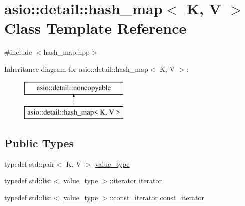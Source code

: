 \hypertarget{classasio_1_1detail_1_1hash__map}{}\section{asio\+:\+:detail\+:\+:hash\+\_\+map$<$ K, V $>$ Class Template Reference}
\label{classasio_1_1detail_1_1hash__map}


{\ttfamily \#include $<$hash\+\_\+map.\+hpp$>$}

Inheritance diagram for asio\+:\+:detail\+:\+:hash\+\_\+map$<$ K, V $>$\+:\begin{figure}[H]
\begin{center}
\leavevmode
\includegraphics[height=2.000000cm]{classasio_1_1detail_1_1hash__map}
\end{center}
\end{figure}
\subsection*{Public Types}
\begin{DoxyCompactItemize}
\item 
typedef std\+::pair$<$ K, V $>$ \hyperlink{classasio_1_1detail_1_1hash__map_a951382d3db34c58e0a38adccba7f084e}{value\+\_\+type}
\item 
typedef std\+::list$<$ \hyperlink{classasio_1_1detail_1_1hash__map_a951382d3db34c58e0a38adccba7f084e}{value\+\_\+type} $>$\+::\hyperlink{classasio_1_1detail_1_1hash__map_a0f24b597db0331311f431ad015e3b558}{iterator} \hyperlink{classasio_1_1detail_1_1hash__map_a0f24b597db0331311f431ad015e3b558}{iterator}
\item 
typedef std\+::list$<$ \hyperlink{classasio_1_1detail_1_1hash__map_a951382d3db34c58e0a38adccba7f084e}{value\+\_\+type} $>$\+::\hyperlink{classasio_1_1detail_1_1hash__map_ab0e2b29d40bba3e3c772850e6dbca0d5}{const\+\_\+iterator} \hyperlink{classasio_1_1detail_1_1hash__map_ab0e2b29d40bba3e3c772850e6dbca0d5}{const\+\_\+iterator}
\end{DoxyCompactItemize}
